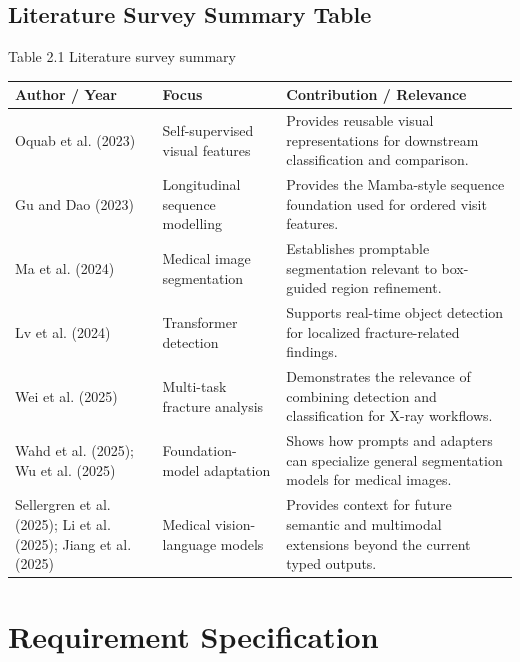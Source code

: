 \documentclass[12pt,a4paper]{article}
\begin{document}
\subsection{Literature Survey Summary Table}
\begin{center}
{\fontsize{9.5pt}{12pt}\selectfont Table 2.1 Literature survey summary\par}
\vspace{5pt}
\begin{tabularx}{0.94\textwidth}{|p{}|p{}|X|}
\hline
\centering\textbf{Author / Year} & \centering\textbf{Focus} & \centering\arraybackslash\textbf{Contribution / Relevance}\\\hline
Oquab et al. (2023) & Self-supervised visual features & Provides reusable visual representations for downstream classification and comparison.\\\hline
Gu and Dao (2023) & Longitudinal sequence modelling & Provides the Mamba-style sequence foundation used for ordered visit features.\\\hline
Ma et al. (2024) & Medical image segmentation & Establishes promptable segmentation relevant to box-guided region refinement.\\\hline
Lv et al. (2024) & Transformer detection & Supports real-time object detection for localized fracture-related findings.\\\hline
Wei et al. (2025) & Multi-task fracture analysis & Demonstrates the relevance of combining detection and classification for X-ray workflows.\\\hline
Wahd et al. (2025); Wu et al. (2025) & Foundation-model adaptation & Shows how prompts and adapters can specialize general segmentation models for medical images.\\\hline
Sellergren et al. (2025); Li et al. (2025); Jiang et al. (2025) & Medical vision-language models & Provides context for future semantic and multimodal extensions beyond the current typed outputs.\\\hline
\end{tabularx}
\end{center}

\clearpage
\setcounter{section}{3}
\section{Requirement Specification}
\end{document}
